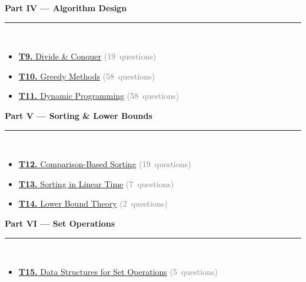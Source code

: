 \documentclass[12pt,a3paper]{article}
\begin{document}
\begin{tcolorbox}[colback=cD!5,colframe=cD,boxrule=1pt,arc=5pt,
  left=8pt,right=8pt,top=8pt,bottom=8pt,before skip=4pt]
  {\large\bfseries\textcolor{cD}{Part IV --- Algorithm Design}}\\[5pt]
  \textcolor{cD!40}{\rule{\textwidth}{0.4pt}}\\[3pt]
  \small\begin{itemize}[leftmargin=1.2em,itemsep=1pt,label={\textcolor{cD}{$\triangleright$}}]
    \item \hyperref[sec:T9]{\textbf{T9.} Divide \& Conquer} \textcolor{gray}{\small(19~questions)}
    \item \hyperref[sec:T10]{\textbf{T10.} Greedy Methods} \textcolor{gray}{\small(58~questions)}
    \item \hyperref[sec:T11]{\textbf{T11.} Dynamic Programming} \textcolor{gray}{\small(58~questions)}
  \end{itemize}
\end{tcolorbox}

\begin{tcolorbox}[colback=cE!5,colframe=cE,boxrule=1pt,arc=5pt,
  left=8pt,right=8pt,top=8pt,bottom=8pt,before skip=4pt]
  {\large\bfseries\textcolor{cE}{Part V --- Sorting \& Lower Bounds}}\\[5pt]
  \textcolor{cE!40}{\rule{\textwidth}{0.4pt}}\\[3pt]
  \small\begin{itemize}[leftmargin=1.2em,itemsep=1pt,label={\textcolor{cE}{$\triangleright$}}]
    \item \hyperref[sec:T12]{\textbf{T12.} Comparison-Based Sorting} \textcolor{gray}{\small(19~questions)}
    \item \hyperref[sec:T13]{\textbf{T13.} Sorting in Linear Time} \textcolor{gray}{\small(7~questions)}
    \item \hyperref[sec:T14]{\textbf{T14.} Lower Bound Theory} \textcolor{gray}{\small(2~questions)}
  \end{itemize}
\end{tcolorbox}

\begin{tcolorbox}[colback=cF!5,colframe=cF,boxrule=1pt,arc=5pt,
  left=8pt,right=8pt,top=8pt,bottom=8pt,before skip=4pt]
  {\large\bfseries\textcolor{cF}{Part VI --- Set Operations}}\\[5pt]
  \textcolor{cF!40}{\rule{\textwidth}{0.4pt}}\\[3pt]
  \small\begin{itemize}[leftmargin=1.2em,itemsep=1pt,label={\textcolor{cF}{$\triangleright$}}]
    \item \hyperref[sec:T15]{\textbf{T15.} Data Structures for Set Operations} \textcolor{gray}{\small(5~questions)}
  \end{itemize}
\end{tcolorbox}
\end{document}
